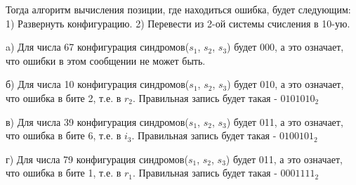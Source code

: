 	\newpage
	\begin{flushleft}
		\small Тогда алгоритм вычисления позиции, где находиться ошибка, будет следующим:
		\linebreak
		\small 1) Развернуть конфигурацию.
		\linebreak
		\small 2) Перевести из 2-ой системы счисления в 10-ую.
		\linebreak
		\vspace*{5mm}
		
		\small a) Для числа 67 конфигурация синдромов($s_1$, $s_2$, $s_3$) будет 000, а это означает, что ошибки в этом сообщении не может быть.
		\linebreak
		\vspace*{5mm}
		
		\small б) Для числа 10 конфигурация синдромов($s_1$, $s_2$, $s_3$) будет 010, а это означает, что ошибка в бите 2, т.е. в $r_2$. Правильная запись будет такая - $0101010_2$
		\linebreak
		\vspace*{5mm}
		
		\small в) Для числа 39 конфигурация синдромов($s_1$, $s_2$, $s_3$) будет 011, а это означает, что ошибка в бите 6, т.е. в $i_3$. Правильная запись будет такая - $0100101_2$
		\linebreak
		\vspace*{5mm}
		
		\small г) Для числа 79 конфигурация синдромов($s_1$, $s_2$, $s_3$) будет 011, а это означает, что ошибка в бите 1, т.е. в $r_1$. Правильная запись будет такая - $0001111_2$
		\linebreak
	\end{flushleft}

